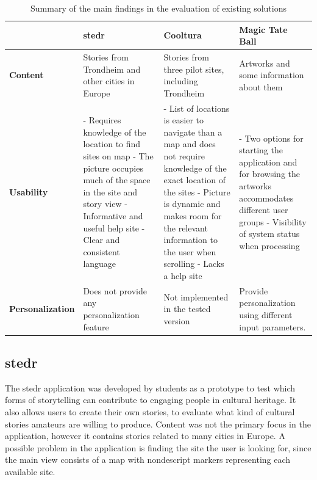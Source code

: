 \begin{table}[t]
	\caption{Summary of the main findings in the evaluation of existing solutions}
	\begin{tabular}[b]{ | p{2.7cm} | >{\raggedright}p{4.3cm} | >{\raggedright}p{4.3cm} | p{4.3cm} |}
		\hline
		\textbf{} & \textbf{stedr} & \textbf{Cooltura} & \textbf{Magic Tate Ball} \\ \hline
		\textbf{Content} & Stories from Trondheim and other cities in Europe & Stories from three pilot sites, including Trondheim & Artworks and some information about them \\ \hline
		\textbf{Usability} & 
			- Requires knowledge of the location to find sites on map \newline
			- The picture occupies much of the space in the site and story view \newline
			- Informative and useful help site\newline
			- Clear and consistent language 
			& 
			- List of locations is easier to navigate than a map and does not require knowledge of the exact location of the sites\newline
			- Picture is dynamic and makes room for the relevant information to the user when scrolling \newline
			- Lacks a help site
			&  
			- Two options for starting the application and for browsing the artworks accommodates different user groups \newline
			- Visibility of system status when processing 
			 \\ \hline
		\textbf{Personalization} & Does not provide any personalization feature & Not implemented in the tested version & Provide personalization using different input parameters.  \\ \hline
	\end{tabular}
	\label{Tab:existing_solutions}
\end{table}

\subsection{stedr}
\label{subsec:stedr}

The stedr application was developed by students as a prototype to test which forms of storytelling can contribute to engaging people in cultural heritage. It also allows users to create their own stories, to evaluate what kind of cultural stories amateurs are willing to produce. Content was not the primary focus in the application, however it contains stories related to many cities in Europe. A possible problem in the application is finding the site the user is looking for, since the main view consists of a map with nondescript markers representing each available site. \newline

